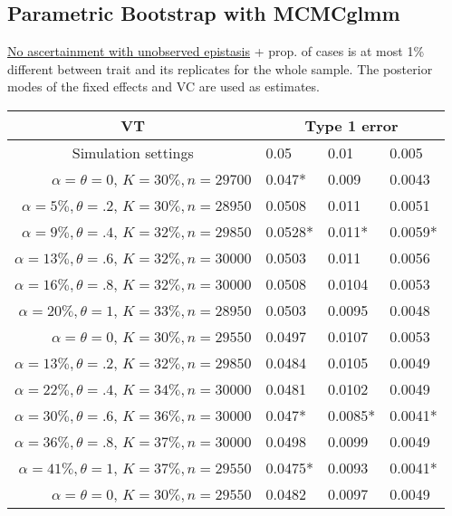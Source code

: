 \documentclass[11pt,a4paper]{article}
\begin{document}
\newpage
\subsection*{Parametric Bootstrap with MCMCglmm}
\underline{No ascertainment with unobserved epistasis} + prop. of cases is at most 1\% different between trait and its replicates for the whole sample. The posterior modes of the fixed effects and VC are used as estimates.

\begin{table}[ht]
\centering
\begin{minipage}[b]{.7\linewidth}
\hfill
\vspace{.4cm}
\begin{tabular}{r|lll}
\multicolumn{1}{c|}{\bf VT}&\multicolumn{3}{c}{Type 1 error}\\
  \hline
\multicolumn{1}{c|}{Simulation settings} & 0.05 & 0.01 & 0.005 \\ 
  \hline\hline %
$\alpha = \theta = 0$, $K=30\%, n=29700$ &   0.047*& 0.009 &0.0043 \\ 
$\alpha = 5\%, \theta = .2$, $K=30\%, n=28950$ &   0.0508& 0.011 &0.0051 \\ 
$\alpha = 9\%, \theta = .4$, $K=32\%, n=29850$ &   0.0528*& 0.011* &0.0059* \\ 
$\alpha = 13\%, \theta = .6$, $K=32\%, n=30000$ &   0.0503& 0.011 &0.0056 \\ 
$\alpha = 16\%, \theta = .8$, $K=32\%, n=30000$ &   0.0508& 0.0104 &0.0053 \\ 
$\alpha = 20\%, \theta = 1$, $K=33\%, n=28950$ &   0.0503& 0.0095 &0.0048 \\ 
 \hline %
$\alpha = \theta = 0$, $K=30\%, n=29550$ &   0.0497& 0.0107 &0.0053 \\ 
$\alpha = 13\%, \theta = .2$, $K=32\%, n=29850$ &   0.0484& 0.0105 &0.0049 \\ 
$\alpha = 22\%, \theta = .4$, $K=34\%, n=30000$ &   0.0481& 0.0102 &0.0049 \\ 
$\alpha = 30\%, \theta = .6$, $K=36\%, n=30000$ &   0.047*& 0.0085* &0.0041* \\ 
$\alpha = 36\%, \theta = .8$, $K=37\%, n=30000$ &   0.0498& 0.0099 &0.0049 \\ 
$\alpha = 41\%, \theta = 1$, $K=37\%, n=29550$ &   0.0475*& 0.0093 &0.0041* \\ 
\hline %
$\alpha = \theta = 0$, $K=30\%, n=29550$ &   0.0482& 0.0097 &0.0049 \\ 

\end{tabular}
\end{minipage}
\end{table}
\end{document}
